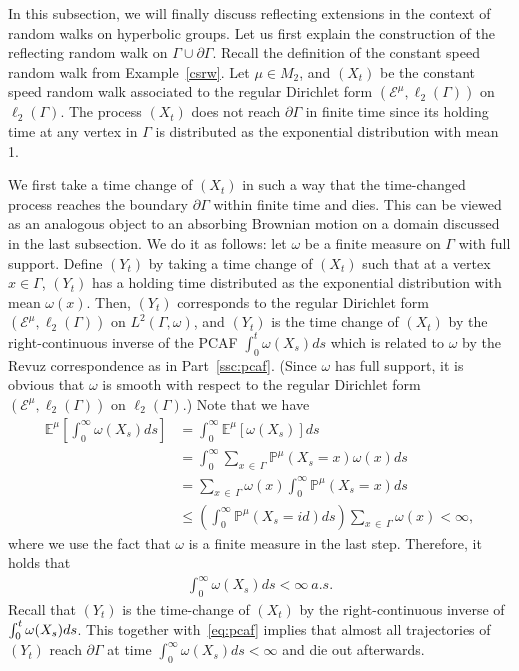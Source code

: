 \documentclass[10pt]{amsart}
\theoremstyle{definition}\newtheorem{defi}[theo]{Definition}\newtheorem{rema}[theo]{Remark}\newtheorem{exam}[theo]{Example}\newtheorem{exem}[theo]{Example}\newtheorem{nota}[theo]{Notation}
\newcommand{\ce}{\mathcal{E}}
\newcommand{\bp}{\mathbb{P}}
\newcommand{\be}{\mathbb{E}}
\begin{document}
In this subsection, we will finally discuss reflecting extensions in the context of random walks on hyperbolic groups. Let us first explain the construction of the reflecting random walk on $\Gamma\cup\partial\Gamma$. Recall the definition of the constant speed random walk from Example~\ref{csrw}. Let $\mu\in M_2$, and $(X_t)$ be the constant speed random walk associated to the regular Dirichlet form $(\ce^{\mu},\ell_2(\Gamma))$ on $\ell_2(\Gamma)$. The process $(X_t)$ does not reach $\partial\Gamma$ in finite time since its holding time at any vertex in $\Gamma$ is distributed as the exponential distribution with mean 1.

We first take a time change of $(X_t)$ in such a way that the time-changed process reaches the boundary $\partial\Gamma$ within finite time and dies. This can be viewed as an analogous object to an absorbing Brownian motion on a domain discussed in the last subsection. We do it as follows: let $\omega$ be a finite measure on $\Gamma$ with full support. Define $(Y_t)$ by taking a time change of $(X_t)$ such that at a vertex $x\in\Gamma$, $(Y_t)$ has a holding time distributed as the exponential distribution with mean $\omega(x)$. Then, $(Y_t)$ corresponds to the regular Dirichlet form $(\ce^{\mu},\ell_2(\Gamma))$ on $L^2(\Gamma,\omega)$, and $(Y_t)$ is the time change of $(X_t)$ by the right-continuous inverse of the PCAF $\int_0^t\omega(X_s)ds$ which is related to $\omega$ by the Revuz correspondence as in Part~\ref{ssc:pcaf}. (Since $\omega$ has full support, it is obvious that $\omega$ is smooth with respect to the regular Dirichlet form $(\ce^{\mu},\ell_2(\Gamma))$ on $\ell_2(\Gamma)$.) Note that we have
\begin{align*}
\be^{\mu}\left[\int_0^{\infty}\omega(X_s)ds\right]&=\int_0^{\infty}\be^{\mu}\left[\omega(X_s)\right]ds\\
&=\int_0^{\infty}\sum_{x\,\in\,\Gamma}\bp^{\mu}(X_s=x)\omega(x)ds\\
&=\sum_{x\,\in\,\Gamma}\omega(x)\int_0^{\infty}\bp^{\mu}(X_s=x)ds\\
&\leq \left(\int_0^{\infty}\bp^{\mu}(X_s=id)ds\right)\sum_{x\,\in\,\Gamma}\omega(x)<\infty,
\end{align*}
where we use the fact that $\omega$ is a finite measure in the last step. Therefore, it holds that
\begin{align}\label{eq:pcaf}
\int_0^{\infty}\omega(X_s)ds<\infty\ a.s.
\end{align}
Recall that $(Y_t)$ is the time-change of $(X_t)$ by the right-continuous inverse of $\int_0^t\omega(X_s)\linebreak ds$. This together with~\eqref{eq:pcaf} implies that almost all trajectories of $(Y_t)$ reach $\partial\Gamma$ at time $\int_0^{\infty}\omega(X_s)ds<\infty$ and die out afterwards.
\end{document}
